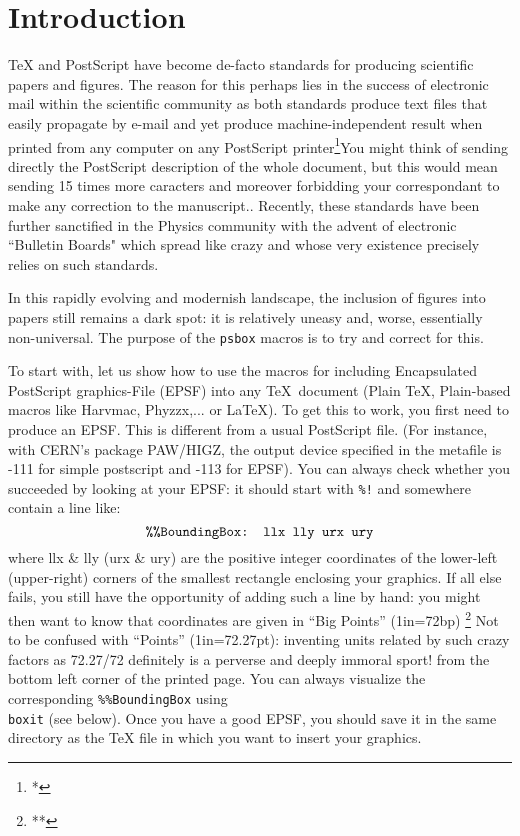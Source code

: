 {{{{{{{{{{{{{{{{}
\vfill\break
\section{Introduction}
\TeX{} and PostScript have become de-facto standards for
producing scientific papers and figures. The reason for this perhaps
lies in the success of electronic mail within the scientific
community as both standards produce text files that easily propagate by
e-mail and yet produce machine-independent result when printed from any
computer on any PostScript printer\footnote{*}{You might think of
sending directly the PostScript description of the whole document, but
this would mean sending 15 times more caracters and moreover
forbidding your correspondant to make any correction to the
manuscript.}. Recently, these standards have been further sanctified in
the Physics community with the advent of electronic ``Bulletin Boards"
which spread like crazy and whose very existence precisely relies on
such standards.

In this rapidly evolving and modernish landscape, the
inclusion of figures into papers still remains a dark spot: it is
relatively uneasy and, worse, essentially non-universal. The purpose of the
{\tt psbox} macros is to try and correct for this.

To start with, let us show how to use the macros for including
Encapsulated PostScript graphics-File (EPSF) into any \TeX\ document
(Plain \TeX, Plain-based macros like Harvmac, Phyzzx,... or \LaTeX).
To get this to work, you first need to produce an EPSF. This
is different from a usual PostScript file. (For instance, with CERN's
package PAW/HIGZ, the output device specified in the metafile is -111
for simple postscript and -113 for EPSF). You can always check whether
you succeeded by looking at your EPSF: it should start with {\tt\%!}
and somewhere contain a line like:
$$
\hbox{\tt\%\%BoundingBox: llx lly urx ury\hfil}
$$
where llx \& lly (urx \& ury) are the positive integer coordinates of
the lower-left (upper-right) corners of the smallest rectangle enclosing
your graphics. If all else fails, you still have the opportunity of
adding such a line by hand: you might then want to know that
coordinates are given in ``Big Points'' (1in=72bp)%
\footnote{**}{%
Not to be confused with ``Points'' (1in=72.27pt): inventing units
related by such crazy factors as 72.27/72 definitely is a perverse and
deeply immoral sport!}
from the bottom left
corner of the printed page. You can always visualize the corresponding
{\tt\%\%BoundingBox} using {\tt\\boxit} (see below). Once you have a
good EPSF, you should save it in the same directory as the \TeX{}
file in which you want to insert your graphics.

}}}}}}}}}}}}}}}
